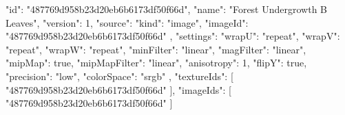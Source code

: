 {
  "id": "487769d958b23d20eb6b6173df50f66d",
  "name": "Forest Undergrowth B Leaves",
  "version": 1,
  "source": {
    "kind": "image",
    "imageId": "487769d958b23d20eb6b6173df50f66d"
  },
  "settings": {
    "wrapU": "repeat",
    "wrapV": "repeat",
    "wrapW": "repeat",
    "minFilter": "linear",
    "magFilter": "linear",
    "mipMap": true,
    "mipMapFilter": "linear",
    "anisotropy": 1,
    "flipY": true,
    "precision": "low",
    "colorSpace": "srgb"
  },
  "textureIds": [
    "487769d958b23d20eb6b6173df50f66d"
  ],
  "imageIds": [
    "487769d958b23d20eb6b6173df50f66d"
  ]
}
